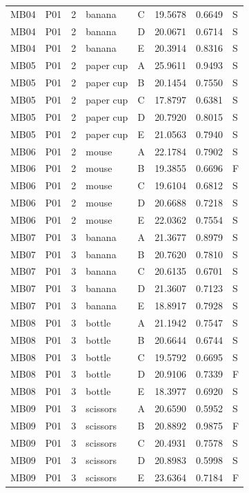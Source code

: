 \documentclass[11pt]{article}
\begin{document}
\begin{longtable}{lll llrrl}
MB04 & P01 & 2 & banana & C & 19.5678 & 0.6649 & S \\
MB04 & P01 & 2 & banana & D & 20.0671 & 0.6714 & S \\
MB04 & P01 & 2 & banana & E & 20.3914 & 0.8316 & S \\
MB05 & P01 & 2 & paper cup & A & 25.9611 & 0.9493 & S \\
MB05 & P01 & 2 & paper cup & B & 20.1454 & 0.7550 & S \\
MB05 & P01 & 2 & paper cup & C & 17.8797 & 0.6381 & S \\
MB05 & P01 & 2 & paper cup & D & 20.7920 & 0.8015 & S \\
MB05 & P01 & 2 & paper cup & E & 21.0563 & 0.7940 & S \\
MB06 & P01 & 2 & mouse & A & 22.1784 & 0.7902 & S \\
MB06 & P01 & 2 & mouse & B & 19.3855 & 0.6696 & F \\
MB06 & P01 & 2 & mouse & C & 19.6104 & 0.6812 & S \\
MB06 & P01 & 2 & mouse & D & 20.6688 & 0.7218 & S \\
MB06 & P01 & 2 & mouse & E & 22.0362 & 0.7554 & S \\
MB07 & P01 & 3 & banana & A & 21.3677 & 0.8979 & S \\
MB07 & P01 & 3 & banana & B & 20.7620 & 0.7810 & S \\
MB07 & P01 & 3 & banana & C & 20.6135 & 0.6701 & S \\
MB07 & P01 & 3 & banana & D & 21.3607 & 0.7123 & S \\
MB07 & P01 & 3 & banana & E & 18.8917 & 0.7928 & S \\
MB08 & P01 & 3 & bottle & A & 21.1942 & 0.7547 & S \\
MB08 & P01 & 3 & bottle & B & 20.6644 & 0.6744 & S \\
MB08 & P01 & 3 & bottle & C & 19.5792 & 0.6695 & S \\
MB08 & P01 & 3 & bottle & D & 20.9106 & 0.7339 & F \\
MB08 & P01 & 3 & bottle & E & 18.3977 & 0.6920 & S \\
MB09 & P01 & 3 & scissors & A & 20.6590 & 0.5952 & S \\
MB09 & P01 & 3 & scissors & B & 20.8892 & 0.9875 & F \\
MB09 & P01 & 3 & scissors & C & 20.4931 & 0.7578 & S \\
MB09 & P01 & 3 & scissors & D & 20.8983 & 0.5998 & S \\
MB09 & P01 & 3 & scissors & E & 23.6364 & 0.7184 & F \\

\end{longtable}
\end{document}
